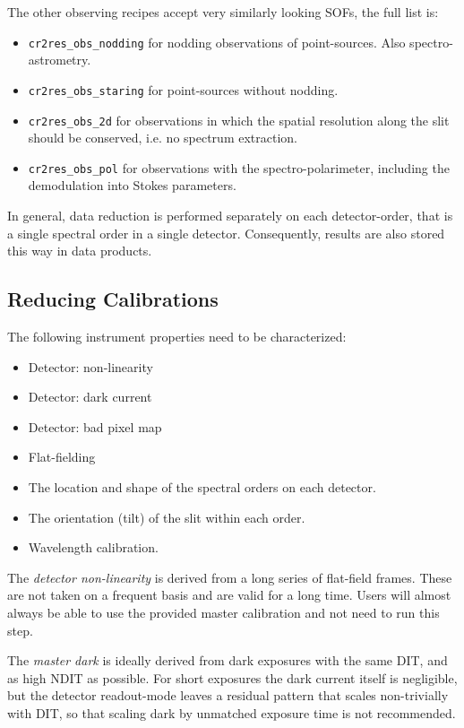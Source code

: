 The other observing recipes accept very similarly looking SOFs, the full list
is:
\begin{itemize}
    \item \texttt{cr2res\_obs\_nodding} for nodding observations of
        point-sources. Also spectro-astrometry.
    \item \texttt{cr2res\_obs\_staring} for point-sources without nodding.
    \item \texttt{cr2res\_obs\_2d} for observations in which the spatial
        resolution along the slit should be conserved, i.e. no spectrum extraction.
    \item \texttt{cr2res\_obs\_pol} for observations with the
        spectro-polarimeter, including the demodulation into Stokes parameters. 
\end{itemize}


In general, data reduction is performed separately on each detector-order,
that is a single spectral order in a single detector.
Consequently, results are also stored this way in data products.


\subsection{Reducing Calibrations}
\label{sec:calib:reduc}

The following instrument properties need to be characterized:
\begin{itemize}
    \item Detector: non-linearity
    \item Detector: dark current
    \item Detector: bad pixel map
    \item Flat-fielding
    \item The location and shape of the spectral orders on each detector.
    \item The orientation (tilt) of the slit within each order.
    \item Wavelength calibration.
\end{itemize}

The \emph{detector non-linearity} is derived from a long series of flat-field
frames. These are not taken on a frequent basis and are valid for a long time.
Users will almost always be able to use the provided master calibration and not
need to run this step.

The \emph{master dark} is ideally derived from dark exposures with the
same DIT, and as high NDIT as possible. For short exposures the dark current
itself is negligible, but the detector readout-mode leaves a residual pattern
that scales non-trivially with DIT, so that scaling dark by unmatched exposure
time is not recommended.

